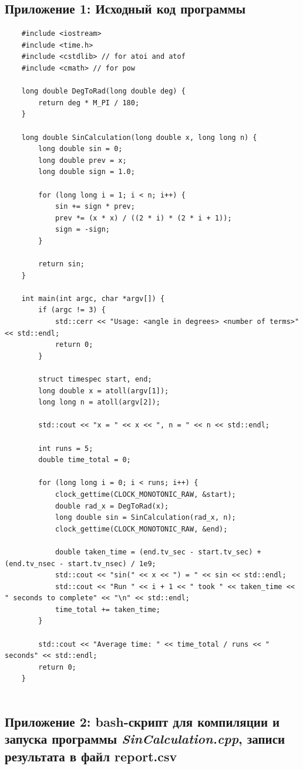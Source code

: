 \documentclass[12pt,a4paper]{article}
\numberwithin{subsection}{section}
\begin{document}
\subsection*{Приложение 1: Исходный код программы}
\begin{lstlisting}
    #include <iostream>
    #include <time.h>
    #include <cstdlib> // for atoi and atof
    #include <cmath> // for pow
    
    long double DegToRad(long double deg) {
        return deg * M_PI / 180;
    }
    
    long double SinCalculation(long double x, long long n) {
        long double sin = 0;
        long double prev = x;
        long double sign = 1.0;
    
        for (long long i = 1; i < n; i++) {
            sin += sign * prev;
            prev *= (x * x) / ((2 * i) * (2 * i + 1));
            sign = -sign;
        }
    
        return sin;
    }
    
    int main(int argc, char *argv[]) {
        if (argc != 3) {
            std::cerr << "Usage: <angle in degrees> <number of terms>" << std::endl;
            return 0;
        }
    
        struct timespec start, end;
        long double x = atoll(argv[1]);
        long long n = atoll(argv[2]);
    
        std::cout << "x = " << x << ", n = " << n << std::endl;
    
        int runs = 5;
        double time_total = 0;
    
        for (long long i = 0; i < runs; i++) {
            clock_gettime(CLOCK_MONOTONIC_RAW, &start);
            double rad_x = DegToRad(x);
            long double sin = SinCalculation(rad_x, n);
            clock_gettime(CLOCK_MONOTONIC_RAW, &end);
    
            double taken_time = (end.tv_sec - start.tv_sec) + (end.tv_nsec - start.tv_nsec) / 1e9;
            std::cout << "sin(" << x << ") = " << sin << std::endl;
            std::cout << "Run " << i + 1 << " took " << taken_time << " seconds to complete" << "\n" << std::endl;
            time_total += taken_time;
        }
    
        std::cout << "Average time: " << time_total / runs << " seconds" << std::endl;
        return 0;
    }
    
\end{lstlisting}

\subsection*{Приложение 2: bash-скрипт для компиляции и запуска программы 
\textit{SinCalculation.cpp}, записи результата в файл report.csv}
\end{document}
